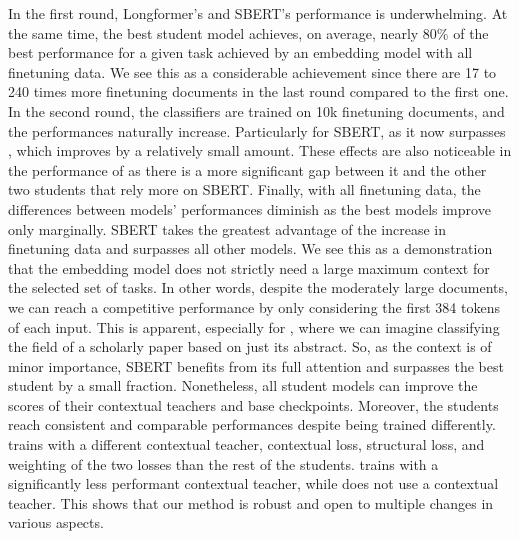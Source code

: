 In the first round, Longformer's and SBERT's performance is underwhelming. At
the same time, the best student model achieves, on average, nearly 80\% of the
best performance for a given task achieved by an embedding model with all
finetuning data. We see this as a considerable achievement since there are 17
to 240 times more finetuning documents in the last round compared to the first
one. In the second round, the classifiers are trained on 10k finetuning
documents, and the performances naturally increase. Particularly for SBERT, as
it now surpasses , which improves by a relatively small amount. These
effects are also noticeable in the performance of {\CosineStudent} as there is
a more significant gap between it and the other two students that rely more on
SBERT. Finally, with all finetuning data, the differences between models'
performances diminish as the best models improve only marginally. SBERT takes
the greatest advantage of the increase in finetuning data and surpasses all
other models. We see this as a demonstration that the embedding model does not
strictly need a large maximum context for the selected set of tasks. In other
words, despite the moderately large documents, we can reach a competitive
performance by only considering the first 384 tokens of each input. This is
apparent, especially for , where we can imagine classifying the
field of a scholarly paper based on just its abstract. So, as the context is of
minor importance, SBERT benefits from its full attention and surpasses the best
student by a small fraction. Nonetheless, all student models can improve the
scores of their contextual teachers and base checkpoints. Moreover, the
students reach consistent and comparable performances despite being trained
differently. {\CosineStudent} trains with a different contextual teacher,
contextual loss, structural loss, and weighting of the two losses than the rest
of the students. {\MSEStudent} trains with a significantly less performant
contextual teacher, while {\OnlyMSEStudent} does not use a contextual teacher.
This shows that our method is robust and open to multiple changes in various
aspects.


